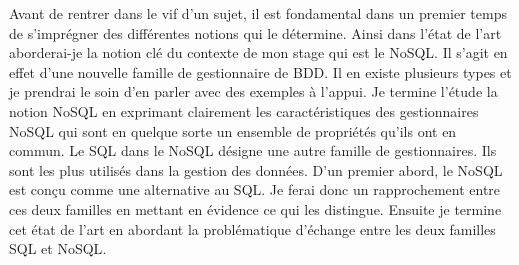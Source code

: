 Avant de rentrer dans le vif d'un sujet, il est fondamental dans un
premier temps de s'imprégner des différentes notions qui le détermine.
Ainsi dans l'état de l'art aborderai-je la notion clé du contexte de
mon stage qui est le \textsf{NoSQL}. Il s'agit en effet d'une nouvelle
famille de gestionnaire de \textsf{BDD}. Il en existe plusieurs types
et je prendrai le soin d'en parler avec des exemples à l'appui. Je
termine l'étude la notion \textsf{NoSQL} en exprimant clairement les
caractéristiques des gestionnaires \textsf{NoSQL} qui sont en quelque
sorte un ensemble de propriétés qu'ils ont en commun. Le \textsf{SQL}
dans le \textsf{NoSQL} désigne une autre famille de gestionnaires.
Ils sont les plus utilisés dans la gestion des données. D'un premier
abord, le \textsf{NoSQL} est conçu comme une alternative
au \textsf{SQL}. Je ferai donc un rapprochement entre ces deux
familles en mettant en évidence ce qui les distingue. Ensuite je termine
cet état de l'art en abordant la problématique d'échange entre les deux familles
\textsf{SQL} et \textsf{NoSQL}.


